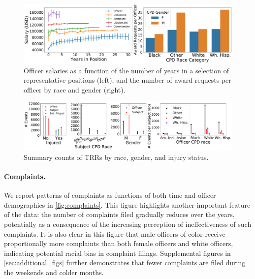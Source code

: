 \begin{figure}[t!] 
\includegraphics[width=\textwidth]{figs/salary_awards.pdf} 
\caption{Officer salaries as a function of the number of years in a selection of representative positions (left),
and the number of award requests per officer by race and gender (right).} \label{fig:salary_awards}
\end{figure}
\begin{figure}[t!] 
	\includegraphics[width=\textwidth]{figs/trr_stats} 
	\caption{Summary counts of TRRs by race, gender, and injury status.} \label{fig:trrs_stats1}
\end{figure}


\paragraph{Complaints.} 
We report patterns of complaints as functions of both time and officer
demographics in \cref{fig:complaints}. This figure highlights another important
feature of the data: the number of complaints filed gradually reduces over the
years, potentially as a consequence of the increasing perception 
of ineffectiveness of
such complaints.  It is also clear in this figure that male officers
of color receive proportionally more complaints than both female officers and
white officers, indicating potential racial bias in complaint filings.
Supplemental figures in \cref{sec:additional_figs} further demonstrates that
fewer complaints are filed during the weekends and colder months.

